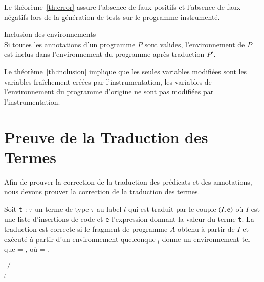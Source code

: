 Le théorème~\ref{th:error} assure l'absence de faux positifs et l'absence de
faux négatifs lors de la génération de tests sur le programme instrumenté.

\begin{theorem}{Inclusion des environnements}\label{th:inclusion}~\\
  Si toutes les annotations d'un programme $P$ sont valides, l'environnement de
  $P$ est inclus dans l'environnement du programme après traduction $P'$.
\end{theorem}


Le théorème~\ref{th:inclusion} implique que les seules variables modifiées sont
les variables fraîchement créées par l'instrumentation, les variables de
l'environnement du programme d'origine ne sont pas modifiées par
l'instrumentation.


\section{Preuve de la Traduction des Termes}
\label{sec:term-translation}

Afin de prouver la correction de la traduction des prédicats et des annotations,
nous devons prouver la correction de la traduction des termes.

\begin{lemma}
  \label{lem:term-correct}
  Soit \lstinline't' : $\tau$ un terme de type $\tau$ au label $l$ qui est
  traduit par le couple $(I, \mbox{\lstinline'e'})$ où $I$ est une liste
  d'insertions de code et \lstinline'e' l'expression donnant la valeur du terme
  \lstinline't'.
  La traduction est correcte si le fragment de programme $A$ obtenu à partir de
  $I$ et exécuté à partir d'un environnement quelconque \env$_l$ donne un
  environnement \env{} tel que
   = , où
  \env = .
\end{lemma}

\begin{corollary}
  \label{lem:term-noerror}
  \env $\neq$ \errorenv
\end{corollary}

\begin{corollary}
  \label{lem:term-subset}
  \env$_l$ \subenv{} \env
\end{corollary}

